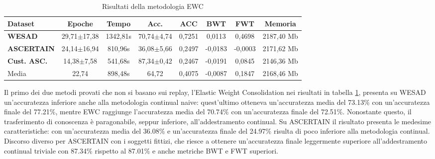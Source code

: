 \begin{table}[h]
\footnotesize
    \begin{tabular}{l|c|c|c|c|c|c|c}
        \textbf{Dataset} & \textbf{Epoche} & \textbf{Tempo} & \textbf{Acc.} & \textbf{ACC} & \textbf{BWT} & \textbf{FWT} & \textbf{Memoria}\\
        \hline
        \textbf{WESAD} & 29,71$\pm$17,38 & 1342,81s & 70,74$\pm$4,74 & 0,7251 & 0,0113 & 0,4698 & 2187,40 Mb\\
        \textbf{ASCERTAIN} & 24,14$\pm$16,94 & 810,96s & 36,08$\pm$5,66 & 0,2497 & -0,0183 & -0,0003 & 2171,62 Mb\\
        \textbf{Cust. ASC.} & 14,38$\pm$7,58 & 541,68s & 87,34$\pm$0,42 & 0,2467 & -0,0191 & 0,0845 & 2146,36 Mb\\
        \hline
        Media & 22,74 & 898,48s & 64,72 & 0,4075 & -0,0087 & 0,1847 & 2168,46 Mb
    \end{tabular}
    \caption{Risultati della metodologia EWC}
    \label{tab:resewc}
\end{table}
Il primo dei due metodi provati che non si basano sui replay, l'Elastic Weight Consolidation nei risultati in tabella \ref{tab:resewc}, presenta su WESAD un'accuratezza inferiore anche alla metodologia continual naive: quest'ultimo otteneva un'accuratezza media del 73.13\% con un'accuratezza finale del 77.21\%, mentre EWC raggiunge l'accuratezza media del 70.74\% con un'accuratezza finale del 72.51\%. Nonostante questo, il trasferimento di conoscenza è paragonabile, seppur inferiore, all'addestramento continual. Su ASCERTAIN il risultato presenta le medesime caratteristiche: con un'accuratezza media del 36.08\% e un'accuratezza finale del 24.97\% risulta di poco inferiore alla metodologia continual. Discorso diverso per ASCERTAIN con i soggetti fittizi, che riesce a ottenere un'accuratezza finale leggermente superiore all'addestramento continual triviale con 87.34\% rispetto al 87.01\% e anche metriche BWT e FWT superiori.

